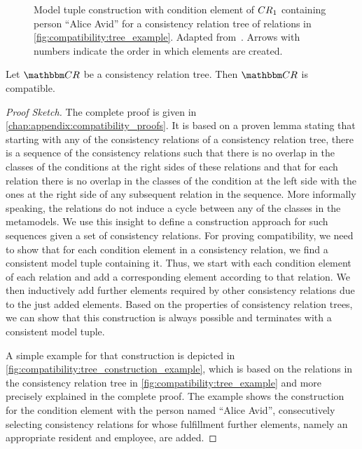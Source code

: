 \begin{figure}
    \centering
    
    \caption[Construction of a model tuple for a consistency relation tree]{Model tuple construction with condition element of $\consistencyrelation{CR}{1}$ containing person \enquote{Alice Avid} for a consistency relation tree of relations in \autoref{fig:compatibility:tree_example}. Adapted from~. Arrows with numbers indicate the order in which elements are created.}
    \label{fig:compatibility:tree_construction_example}
\end{figure}

\begin{theorem} \label{theorem:treecompatibility}
    Let $\consistencyrelationset{CR}$ be a consistency relation tree. Then $\consistencyrelationset{CR}$ is compatible.
\end{theorem}

\begin{proof}[Proof Sketch]
    The complete proof is given in \autoref{chap:appendix:compatibility_proofs}.
    It is based on a proven lemma stating that starting with any of the consistency relations of a consistency relation tree, there is a sequence of the consistency relations such that there is no overlap in the classes of the conditions at the right sides of these relations and that for each relation there is no overlap in the classes of the condition at the left side with the ones at the right side of any subsequent relation in the sequence.
    More informally speaking, the relations do not induce a cycle between any of the classes in the metamodels.
    We use this insight to define a construction approach for such sequences given a set of consistency 
    relations.
    For proving compatibility, we need to show that for each condition element in a consistency relation, we find a consistent model tuple containing it.
    Thus, we start with each condition element of each relation and add a corresponding element according to that relation.
    We then inductively add further elements required by other consistency relations due to the just added elements.
    Based on the properties of consistency relation trees, we can show that this construction is always possible and terminates with a consistent model tuple.
    
    A simple example for that construction is depicted in \autoref{fig:compatibility:tree_construction_example}, which is based on the relations in the consistency relation tree in \autoref{fig:compatibility:tree_example} and more precisely explained in the complete proof.
    The example shows the construction for the condition element with the person named \enquote{Alice Avid}, consecutively selecting consistency relations for whose fulfillment further elements, namely an appropriate resident and employee, are added.
\end{proof}

